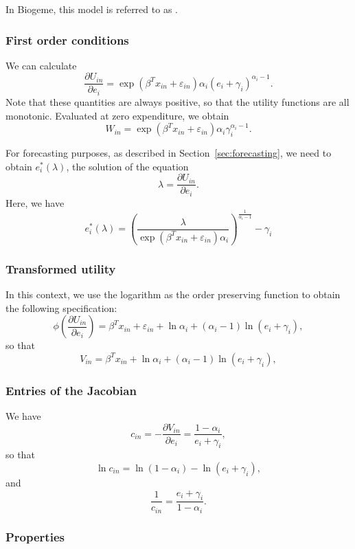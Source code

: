 \documentclass[12pt,a4paper]{article}
\begin{document}
In Biogeme, this model is referred to as
\lstinline@translated@.
\subsubsection*{First order conditions}

We can calculate
\begin{equation}
\frac{\partial U_{in}}{\partial e_i} = \exp(\beta^T x_{in} + \varepsilon_{in})\alpha_i(e_i + \gamma_i)^{\alpha_i-1}.
\end{equation}
Note that these quantities are always positive, so that the utility functions are all monotonic.
Evaluated at zero expenditure, we obtain
\begin{equation}
W_{in} = \exp(\beta^T x_{in} + \varepsilon_{in})\alpha_i \gamma_i^{\alpha_i-1}.
\end{equation}

For forecasting purposes, as described in Section~\ref{sec:forecasting}, we need to obtain $e_i^*(\lambda)$, the solution of the equation
\[\lambda = \frac{\partial U_{in}}{\partial e_i}. \]
Here, we have
\begin{equation}
    \label{eq:translated_optimal}
 e_i^*(\lambda) = \left(\frac{\lambda}{\exp(\beta^T x_{in} + \varepsilon_{in})\alpha_i}\right)^{\frac{1}{\alpha_i-1}} - \gamma_i
\end{equation}

\subsubsection*{Transformed utility}
In this context, we use the logarithm as the order preserving function to obtain the following specification:
\[
\phi\left(\frac{\partial U_{in}}{\partial e_i}\right) =\beta^T x_{in} + \varepsilon_{in} + \ln \alpha_i + (\alpha_i-1) \ln (e_i + \gamma_i),
\]
so that
\[
V_{in} = \beta^T x_{in} + \ln \alpha_i + (\alpha_i-1) \ln (e_i + \gamma_i),
\]

\subsubsection*{Entries of the Jacobian}

We have
\[
c_{in} = -\frac{\partial V_{in}}{\partial e_i} = \frac{1-\alpha_i}{e_i + \gamma_i},
\]
so that
\[
\ln c_{in}  = \ln(1-\alpha_i) - \ln(e_i + \gamma_i),
\]
and
\[
    \frac{1}{c_{in}} = \frac{e_i + \gamma_i}{1-\alpha_i}.
\]

\subsubsection*{Properties}
\end{document}
